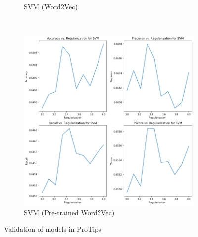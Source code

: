\documentclass[11pt,a4paper]{article}
\begin{document}
\begin{figure}[h!]
\begin{subfigure}[h!]{0.3\textwidth}
		\caption{SVM (Word2Vec)}
		\label{fig:svm1_val}
	\end{subfigure}
	~
	\begin{subfigure}[h!]{0.3\textwidth}
		\includegraphics[width=\linewidth]{plots_svm2.png}
		\caption{SVM (Pre-trained Word2Vec)}
		\label{fig:svm2_val}
	\end{subfigure}
	\caption{Validation of models in ProTips}
	\label{fig:models_val}
\end{figure}
\end{document}
